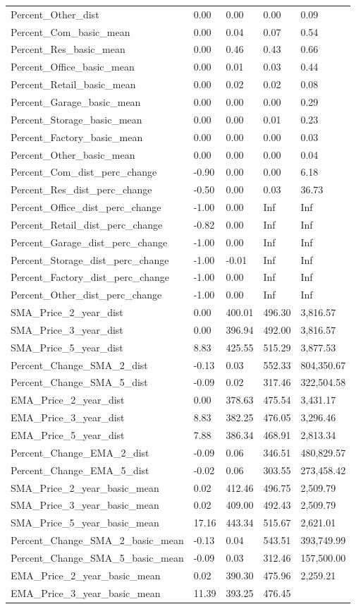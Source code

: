 \documentclass[]{article}
\begin{document}
\begin{longtable}[]{@{}lllll@{}}
Percent\_Other\_dist & 0.00 & 0.00 & 0.00 & 0.09\tabularnewline
Percent\_Com\_basic\_mean & 0.00 & 0.04 & 0.07 & 0.54\tabularnewline
Percent\_Res\_basic\_mean & 0.00 & 0.46 & 0.43 & 0.66\tabularnewline
Percent\_Office\_basic\_mean & 0.00 & 0.01 & 0.03 & 0.44\tabularnewline
Percent\_Retail\_basic\_mean & 0.00 & 0.02 & 0.02 & 0.08\tabularnewline
Percent\_Garage\_basic\_mean & 0.00 & 0.00 & 0.00 & 0.29\tabularnewline
Percent\_Storage\_basic\_mean & 0.00 & 0.00 & 0.01 & 0.23\tabularnewline
Percent\_Factory\_basic\_mean & 0.00 & 0.00 & 0.00 & 0.03\tabularnewline
Percent\_Other\_basic\_mean & 0.00 & 0.00 & 0.00 & 0.04\tabularnewline
Percent\_Com\_dist\_perc\_change & -0.90 & 0.00 & 0.00 &
6.18\tabularnewline
Percent\_Res\_dist\_perc\_change & -0.50 & 0.00 & 0.03 &
36.73\tabularnewline
Percent\_Office\_dist\_perc\_change & -1.00 & 0.00 & Inf &
Inf\tabularnewline
Percent\_Retail\_dist\_perc\_change & -0.82 & 0.00 & Inf &
Inf\tabularnewline
Percent\_Garage\_dist\_perc\_change & -1.00 & 0.00 & Inf &
Inf\tabularnewline
Percent\_Storage\_dist\_perc\_change & -1.00 & -0.01 & Inf &
Inf\tabularnewline
Percent\_Factory\_dist\_perc\_change & -1.00 & 0.00 & Inf &
Inf\tabularnewline
Percent\_Other\_dist\_perc\_change & -1.00 & 0.00 & Inf &
Inf\tabularnewline
SMA\_Price\_2\_year\_dist & 0.00 & 400.01 & 496.30 &
3,816.57\tabularnewline
SMA\_Price\_3\_year\_dist & 0.00 & 396.94 & 492.00 &
3,816.57\tabularnewline
SMA\_Price\_5\_year\_dist & 8.83 & 425.55 & 515.29 &
3,877.53\tabularnewline
Percent\_Change\_SMA\_2\_dist & -0.13 & 0.03 & 552.33 &
804,350.67\tabularnewline
Percent\_Change\_SMA\_5\_dist & -0.09 & 0.02 & 317.46 &
322,504.58\tabularnewline
EMA\_Price\_2\_year\_dist & 0.00 & 378.63 & 475.54 &
3,431.17\tabularnewline
EMA\_Price\_3\_year\_dist & 8.83 & 382.25 & 476.05 &
3,296.46\tabularnewline
EMA\_Price\_5\_year\_dist & 7.88 & 386.34 & 468.91 &
2,813.34\tabularnewline
Percent\_Change\_EMA\_2\_dist & -0.09 & 0.06 & 346.51 &
480,829.57\tabularnewline
Percent\_Change\_EMA\_5\_dist & -0.02 & 0.06 & 303.55 &
273,458.42\tabularnewline
SMA\_Price\_2\_year\_basic\_mean & 0.02 & 412.46 & 496.75 &
2,509.79\tabularnewline
SMA\_Price\_3\_year\_basic\_mean & 0.02 & 409.00 & 492.43 &
2,509.79\tabularnewline
SMA\_Price\_5\_year\_basic\_mean & 17.16 & 443.34 & 515.67 &
2,621.01\tabularnewline
Percent\_Change\_SMA\_2\_basic\_mean & -0.13 & 0.04 & 543.51 &
393,749.99\tabularnewline
Percent\_Change\_SMA\_5\_basic\_mean & -0.09 & 0.03 & 312.46 &
157,500.00\tabularnewline
EMA\_Price\_2\_year\_basic\_mean & 0.02 & 390.30 & 475.96 &
2,259.21\tabularnewline
EMA\_Price\_3\_year\_basic\_mean & 11.39 & 393.25 & 476.45 &

\end{longtable}
\end{document}
